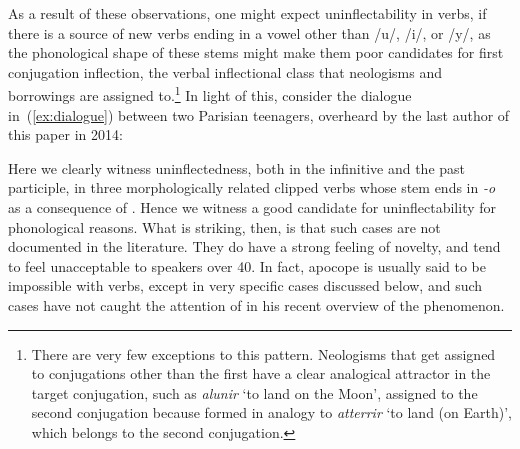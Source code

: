 \documentclass[output=paper,colorlinks,citecolor=brown]{langscibook}
\begin{document}
\largerpage[1]
As a result of these observations, one might expect uninflectability in  verbs, if there is a source of new verbs ending in a vowel other than /u/, /i/, or /y/, as the phonological shape of these stems might make them poor candidates for first conjugation inflection, the verbal inflectional class that neologisms and borrowings are assigned to.\footnote{There are very few exceptions to this pattern. Neologisms that get assigned to conjugations other than the first have a clear analogical attractor in the target conjugation, such as \textit{alunir} `to land on the Moon', assigned to the second conjugation because formed in analogy to \textit{atterrir} `to land (on Earth)', which belongs to the second conjugation.} In light of this, consider the dialogue in~(\ref{ex:dialogue}) between two Parisian teenagers, overheard by the last author of this paper in 2014:

\begin{exe}
	\ex\label{ex:dialogue}\begin{xlist}
		\exi{
			[\ldots]}{}
	\end{xlist}
\end{exe}

Here we clearly witness uninflectedness, both in the infinitive and the past participle, in three morphologically related clipped verbs whose stem ends in \emph{-o} as a consequence of . Hence we witness a good candidate for uninflectability for phonological reasons. What is striking, then, is that such cases are not documented in the literature. They do have a strong feeling of novelty, and tend to feel unacceptable to speakers over 40. In fact,  apocope is usually said to be impossible with verbs, except in very specific cases discussed below, and such cases have not caught the attention of \citet{cerquiglini2019} in his recent overview of the phenomenon. 
\end{document}
